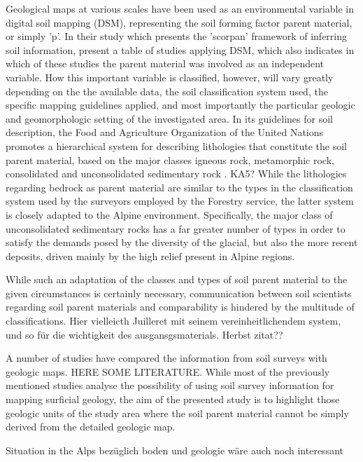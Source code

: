 \documentclass[preprint,12pt,authoryear]{elsarticle}
\begin{document}
Geological maps at various scales have been used as an environmental variable in digital soil mapping (DSM), representing the soil forming factor parent material, or simply 'p'. In their study  which presents the 'scorpan' framework of inferring soil information, \cite{McBratney2003} present a table of studies applying DSM, which also indicates in which of these studies the parent material was involved as an independent variable. How this important variable is classified, however, will vary greatly depending on the the available data, the soil classification system used, the specific mapping guidelines applied, and most importantly the particular geologic and geomorphologic setting of the investigated area. In its guidelines for soil description, the Food and Agriculture Organization of the United Nations promotes a hierarchical system for describing lithologies that constitute the soil parent material, based on the major classes igneous rock, metamorphic rock, consolidated and unconsolidated sedimentary rock \citep{FAO2006}. KA5? While the lithologies regarding bedrock as parent material are similar to the types in the classification system used by the surveyors employed by the Forestry service, the latter system is closely adapted to the Alpine environment. Specifically, the major class of unconsolidated sedimentary rocks has a far greater number of types in order to satisfy the demands posed by the diversity of the glacial, but also the more recent deposits, driven mainly by the high relief present in Alpine regions.

While such an adaptation of the classes and types of soil parent material to the given circumstances is certainly necessary, communication between soil scientists regarding soil parent materials and comparability is hindered by the multitude of classifications.
Hier vielleicth Juilleret mit seinem vereinheitlichendem system, und so für die wichtigkeit des ausgansgsmaterials. Herbst zitat??



A number of studies have compared the information from soil surveys with geologic maps. HERE SOME LITERATURE. While most of the previously mentioned studies analyse the possibility of using soil survey information for mapping surficial geology, the aim of the presented study is to highlight those geologic units of the study area where the soil parent material cannot be simply derived from the detailed geologic map.




 {Situation in the Alps bez{\"u}glich boden und geologie w{\"a}re auch noch interessant}
\end{document}
